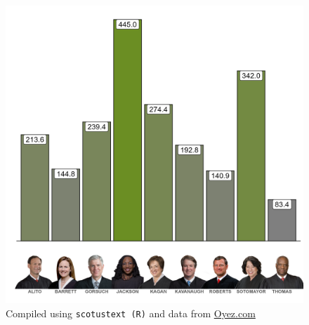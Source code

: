 \begin{landscape}
\begin{figure}[!htb]
\begin{minipage}{0.6\textwidth}
    \vspace{2mm}
    \includegraphics[width=1.1\textwidth]{../oral_arguments/analyses/Combined/justice_time_combined.png}
    \small{Compiled using \texttt{scotustext (R)} and data from \textcolor{blue}{\href{https://www.oyez.org/}{Oyez.com}}}
\end{minipage}
\end{figure}

\end{landscape}  %
